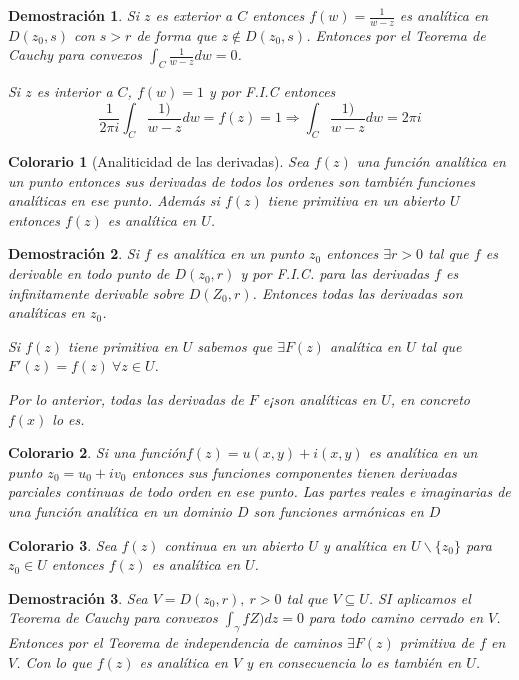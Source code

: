 \documentclass[10pt]{book}
\newtheorem*{dem}{Demostración}
\newtheorem{col}{Colorario}[chapter]
\begin{document}
\begin{dem}
Si $z$ es exterior a $C$ entonces $f(w) = \frac{1}{w-z}$ es analítica en $D(z_0,s)$ con $s>r$ de forma que $z\notin D(z_0,s)$. Entonces por el Teorema de Cauchy para convexos $\int_C \frac{1}{w-z}dw = 0$.

Si $z$ es interior a $C$, $f(w)=1$ y por F.I.C entonces 
$$\frac{1}{2\pi i}\int_C \frac{1)}{w-z}dw = f(z) = 1 \Rightarrow \int_C \frac{1)}{w-z}dw = 2\pi i$$
\end{dem}



\begin{col}[Analiticidad de las derivadas]
Sea $f(z)$ una función analítica en un punto entonces sus derivadas de todos los ordenes son también funciones analíticas en ese punto.
Además si $f(z)$ tiene primitiva en un abierto $U$ entonces $f(z)$ es analítica en $U$.
\end{col}

\begin{dem}
Si $f$ es analítica en un punto $z_0$ entonces $\exists r>0$ tal que $f$ es derivable en todo punto de $D(z_0,r)$ y por F.I.C. para las derivadas $f$ es infinitamente derivable sobre $D(Z_0,r)$. Entonces todas las derivadas son analíticas en $z_0$.

Si $f(z)$ tiene primitiva en $U$ sabemos que $\exists F(z)$ analítica en $U$ tal que $F'(z) = f(z)\ \forall z\in U$.

Por lo anterior, todas las derivadas de $F$ e¡son analíticas en $U$, en  concreto $f(x)$ lo es.
\end{dem}

\begin{col}
Si una función$f(z) = u(x,y)+i(x,y)$ es analítica en un punto $z_0 = u_0 + iv_0$ entonces sus funciones componentes tienen derivadas parciales continuas de todo orden en ese punto.
Las partes reales e imaginarias de una función analítica en un dominio $D$ son funciones armónicas en $D$ 
\end{col}

\begin{col}
Sea $f(z)$ continua en un abierto $U$ y analítica en $U \backslash\{ z_0 \}$ para $z_0 \in U$ entonces $f(z)$ es analítica en $U$.
\end{col}

\begin{dem}
Sea $V=D(z_0,r),\ r>0$ tal que $V \subseteq U$. SI aplicamos el Teorema de Cauchy para convexos $\int_\gamma fZ)dz=0$ para todo camino cerrado en $V$. Entonces por el Teorema de independencia de caminos $\exists F(z)$ primitiva de $f$ en $V$. Con lo que $f(z)$ es analítica en $V$ y en consecuencia lo es también en $U$.
\end{dem}
\end{document}
